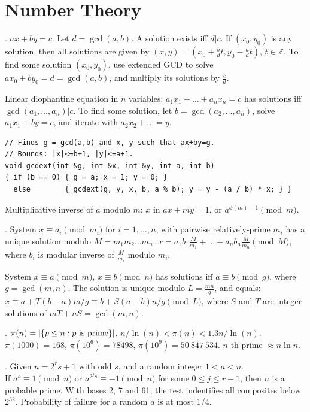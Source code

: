 \section{Number Theory}

. $ax+by=c$.
Let $d=\gcd(a,b)$. A solution exists iff $d|c$.
If $(x_0,y_0)$ is any solution, then all solutions are given by
$(x,y) = (x_0 + \frac{b}{d}t, y_0 - \frac{a}{d}t)$, $t \in {\mathbb Z}$.
To find some solution $(x_0, y_0)$, use extended GCD to solve
$ax_0 + by_0 = d = \gcd(a, b)$, and multiply its solutions by $\frac{c}{d}$.

Linear diophantine equation in $n$ variables:
$a_1 x_1 + \dots + a_n x_n = c$ has solutions iff $\gcd(a_1, \dots, a_n) | c$.
To find some solution, let $b=\gcd(a_2, \dots, a_n)$,
solve $a_1 x_1 + by = c$, and iterate with $a_2 x_2 + \dots = y$.

\begin{verbatim}
// Finds g = gcd(a,b) and x, y such that ax+by=g.
// Bounds: |x|<=b+1, |y|<=a+1.
void gcdext(int &g, int &x, int &y, int a, int b)
{ if (b == 0) { g = a; x = 1; y = 0; }
  else        { gcdext(g, y, x, b, a % b); y = y - (a / b) * x; } }
\end{verbatim}

Multiplicative inverse of $a$ modulo $m$:
$x$ in $ax + my = 1$, or $a^{\phi(m)-1} \pmod{m}$.

.
System $x \equiv a_i \pmod{m_i}$ for $i=1,\dots,n$, with
pairwise relatively-prime $m_i$ has a unique solution modulo $M = m_1 m_2 \dots m_n$:
$x = a_1 b_1 \frac{M}{m_1} + \dots + a_n b_n \frac{M}{m_n} \pmod{M}$,
where $b_i$ is modular inverse of $\frac{M}{m_i}$ modulo $m_i$.

System $x \equiv a \pmod{m}$, $x \equiv b \pmod{n}$ has solutions
iff $a \equiv b \pmod{g}$, where $g=\gcd(m,n)$.
The solution is unique modulo $L=\frac{mn}{g}$, and equals:
$x \equiv a + T(b-a) m/g \equiv b + S(a-b) n/g \pmod{L}$,
where $S$ and $T$ are integer solutions of $mT + nS = \gcd(m,n)$.

. $\pi(n) = |\{p \le n : p \hbox{ is prime}\}|$.
$n/\ln(n) < \pi(n) < 1.3 n/\ln(n)$.
$\pi(1000) = 168$, $\pi(10^6) = 78498$, $\pi(10^9) = 50\ 847\ 534$.
\quad $n$-th prime $\approx n \ln n$.

.
Given $n = 2^r s + 1$ with odd $s$, and a random integer $1 < a < n$. \\
If $a^s \equiv 1 {\pmod n}$ or $a^{2^j s} \equiv -1 {\pmod n}$ for some
$0 \le j \le r-1$, then $n$ is a probable prime.
With bases 2, 7 and 61, the test indentifies all composites below $2^{32}$.
Probability of failure for a random $a$ is at most 1/4.

